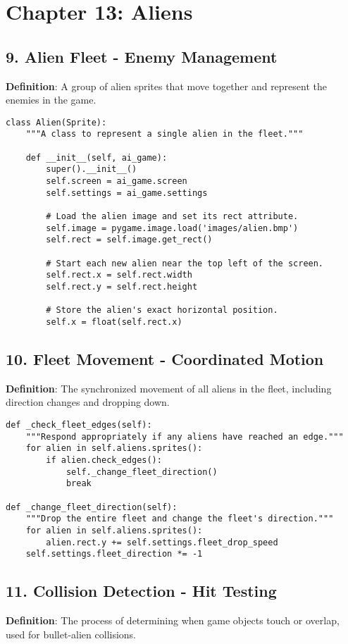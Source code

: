 \section*{Chapter 13: Aliens}

\subsection*{9. Alien Fleet - Enemy Management}
\textbf{Definition}: A group of alien sprites that move together and represent the enemies in the game.

\begin{lstlisting}
class Alien(Sprite):
    """A class to represent a single alien in the fleet."""
    
    def __init__(self, ai_game):
        super().__init__()
        self.screen = ai_game.screen
        self.settings = ai_game.settings
        
        # Load the alien image and set its rect attribute.
        self.image = pygame.image.load('images/alien.bmp')
        self.rect = self.image.get_rect()
        
        # Start each new alien near the top left of the screen.
        self.rect.x = self.rect.width
        self.rect.y = self.rect.height
        
        # Store the alien's exact horizontal position.
        self.x = float(self.rect.x)
\end{lstlisting}

\subsection*{10. Fleet Movement - Coordinated Motion}
\textbf{Definition}: The synchronized movement of all aliens in the fleet, including direction changes and dropping down.

\begin{lstlisting}
def _check_fleet_edges(self):
    """Respond appropriately if any aliens have reached an edge."""
    for alien in self.aliens.sprites():
        if alien.check_edges():
            self._change_fleet_direction()
            break

def _change_fleet_direction(self):
    """Drop the entire fleet and change the fleet's direction."""
    for alien in self.aliens.sprites():
        alien.rect.y += self.settings.fleet_drop_speed
    self.settings.fleet_direction *= -1
\end{lstlisting}

\subsection*{11. Collision Detection - Hit Testing}
\textbf{Definition}: The process of determining when game objects touch or overlap, used for bullet-alien collisions.

